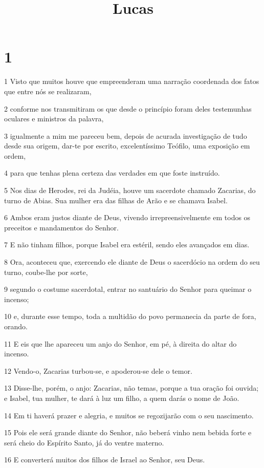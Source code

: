 

\title{Lucas}


\chapter{1}

\par 1 Visto que muitos houve que empreenderam uma narração coordenada dos fatos que entre nós se realizaram,
\par 2 conforme nos transmitiram os que desde o princípio foram deles testemunhas oculares e ministros da palavra,
\par 3 igualmente a mim me pareceu bem, depois de acurada investigação de tudo desde sua origem, dar-te por escrito, excelentíssimo Teófilo, uma exposição em ordem,
\par 4 para que tenhas plena certeza das verdades em que foste instruído.
\par 5 Nos dias de Herodes, rei da Judéia, houve um sacerdote chamado Zacarias, do turno de Abias. Sua mulher era das filhas de Arão e se chamava Isabel.
\par 6 Ambos eram justos diante de Deus, vivendo irrepreensivelmente em todos os preceitos e mandamentos do Senhor.
\par 7 E não tinham filhos, porque Isabel era estéril, sendo eles avançados em dias.
\par 8 Ora, aconteceu que, exercendo ele diante de Deus o sacerdócio na ordem do seu turno, coube-lhe por sorte,
\par 9 segundo o costume sacerdotal, entrar no santuário do Senhor para queimar o incenso;
\par 10 e, durante esse tempo, toda a multidão do povo permanecia da parte de fora, orando.
\par 11 E eis que lhe apareceu um anjo do Senhor, em pé, à direita do altar do incenso.
\par 12 Vendo-o, Zacarias turbou-se, e apoderou-se dele o temor.
\par 13 Disse-lhe, porém, o anjo: Zacarias, não temas, porque a tua oração foi ouvida; e Isabel, tua mulher, te dará à luz um filho, a quem darás o nome de João.
\par 14 Em ti haverá prazer e alegria, e muitos se regozijarão com o seu nascimento.
\par 15 Pois ele será grande diante do Senhor, não beberá vinho nem bebida forte e será cheio do Espírito Santo, já do ventre materno.
\par 16 E converterá muitos dos filhos de Israel ao Senhor, seu Deus.
